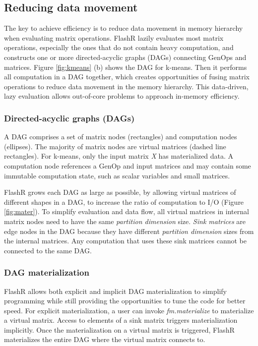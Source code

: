 \subsection{Reducing data movement}\label{sec:datamove}
The key to achieve efficiency is to reduce data movement in memory hierarchy
when evaluating matrix operations. FlashR lazily evaluates most matrix
operations, especially the ones that do not contain heavy computation,
and constructs one or more directed-acyclic graphs (DAGs) connecting GenOps and
matrices. Figure \ref{fig:kmeans} (b) shows the DAG for k-means. Then it
performs all computation in a DAG together, which creates opportunities
of fusing matrix operations to reduce data movement in the memory hierarchy.
This data-driven, lazy evaluation allows out-of-core problems 
to approach in-memory efficiency.

\subsubsection{Directed-acyclic graphs (DAGs)} \label{dag}
A DAG comprises a set of matrix nodes (rectangles) and computation nodes
(ellipses). The majority of matrix nodes are virtual matrices (dashed line rectangles).
For k-means, only the input matrix \textit{X} has materialized data.
A computation node references a GenOp and input matrices and
may contain some immutable computation state, such as scalar variables and
small matrices. 

FlashR grows each DAG as large as possible, by allowing virtual matrices
of different shapes in a DAG, to increase the ratio of computation to I/O
(Figure \ref{fig:mater}). To simplify evaluation and data flow, 
all virtual matrices in internal matrix nodes need to have the same
\textit{partition dimension} size. \textit{Sink matrices} are edge nodes
in the DAG because they have different \textit{partition dimension} sizes
from the internal matrices. Any computation that uses these
sink matrices cannot be connected to the same DAG.  

\subsubsection{DAG materialization}
FlashR allows both explicit and implicit DAG materialization to simplify
programming while still providing the opportunities to tune the code for
better speed. For explicit materialization, a user can invoke
\textit{fm.materialize} to materialize a virtual matrix. Access to elements
of a sink matrix triggers materialization implicitly. Once
the materialization on a virtual matrix is triggered, FlashR materializes
the entire DAG where the virtual matrix connects to.

